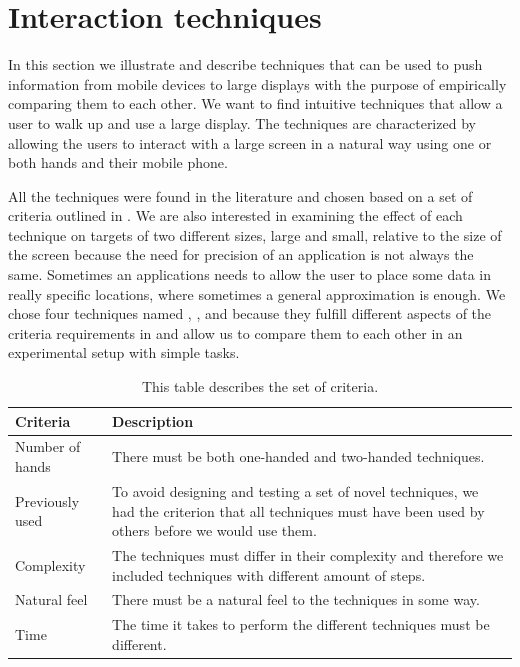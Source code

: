 \section{Interaction techniques} \label{sec:techniques}
In this section we illustrate and describe techniques that can be used to push information from mobile devices to large displays with the purpose of empirically comparing them to each other.
We want to find intuitive techniques that allow a user to walk up and use a large display.
The techniques are characterized by allowing the users to interact with a large screen in a natural way using one or both hands and their mobile phone.

All the techniques were found in the literature and chosen based on a set of criteria outlined in . 
We are also interested in examining the effect of each technique on targets of two different sizes, large and small, relative to the size of the screen because the need for precision of an application is not always the same. 
Sometimes an applications needs to allow the user to place some data in really specific locations, where sometimes a general approximation is enough.
We chose four techniques named \pinch, \swipe, \throw and \tilt because they fulfill different aspects of the criteria requirements in  and allow us to compare them to each other in an experimental setup with simple tasks.

\begin{table}[H]
	\centering
	\begin{tabular}{|p{}|p{}|}
		\hline
		\rowcolor[HTML]{9B9B9B} 
		\textbf{Criteria} & \textbf{Description} \\ \hline
		Number of hands & There must be both one-handed and two-handed techniques. \\ \hline
		Previously used & To avoid designing and testing a set of novel techniques, we had the criterion that all techniques must have been used by others before we would use them. \\ \hline
		Complexity & The techniques must differ in their complexity and therefore we included techniques with different amount of steps. \\ \hline
		Natural feel & There must be a natural feel to the techniques in some way. \\ \hline
		Time & The time it takes to perform the different techniques must be different. \\ \hline
	\end{tabular}
	\caption{This table describes the set of criteria.}
	\label{tab:techniqueCriteria}
\end{table}

